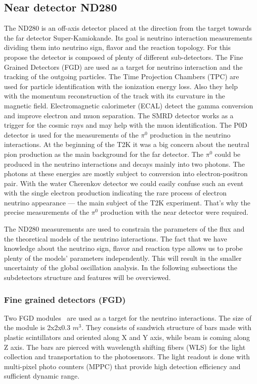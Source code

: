 \documentclass[../main.tex]{subfiles}
\begin{document}
\subsection{Near detector ND280}
\label{sec:T2K:nd280}
The ND280 is an off-axis detector placed at the direction from the target towards the far detector Super-Kamiokande. Its goal is neutrino interaction measurements dividing them into neutrino sign, flavor and the reaction topology. For this propose the detector is composed of plenty of different sub-detectors. The Fine Grained Detectors (FGD) are used as a target for neutrino interaction and the tracking of the outgoing particles. The Time Projection Chambers (TPC) are used for particle identification with the ionization energy loss. Also they help with the momentum reconstruction of the track with its curvature in the magnetic field. Electromagnetic calorimeter (ECAL) detect the gamma conversion and improve electron and muon separation. The SMRD detector works as a trigger for the cosmic rays and may help with the muon identification. The P0D detector is used for the measurements of the $\pi^0$ production in the neutrino interactions. At the beginning of the T2K it was a big concern about the neutral pion production as the main background for the far detector. The $\pi^0$ could be produced in the neutrino interactions and decays mainly into two photons. The photons at these energies are mostly subject to conversion into electron-positron pair. With the water Cherenkov detector we could easily confuse such an event with the single electron production indicating the rare process of electron neutrino appearance --- the main subject of the T2K experiment. That's why the precise measurements of the $\pi^0$ production with the near detector were required.

The ND280 measurements are used to constrain the parameters of the flux and the theoretical models of the neutrino interactions. The fact that we have knowledge about the neutrino sign, flavor and reaction type allows us to probe plenty of the models' parameters independently. This will result in the smaller uncertainty of the global oscillation analysis. In the following subsections the subdetectors structure and features will be overviewed.

\subsubsection{Fine grained detectors (FGD)}
Two FGD modules~\cite{Amaudruz2012} are used as a target for the neutrino interactions. The size of the module is 2x2x0.3 $m^3$. They consists of sandwich structure of bars made with plastic scintillators and oriented along X and Y axis, while beam is coming along Z axis. The bars are pierced with wavelength shifting fibers (WLS) for the light collection and transportation to the photosensors. The light readout is done with multi-pixel photo counters (MPPC) that provide high detection efficiency and sufficient dynamic range.
\end{document}
